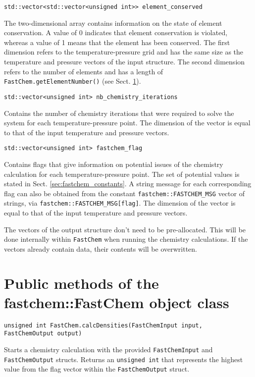 \documentclass[numbers=noenddot]{aux/fcmanual}
\newcommand{\fc}{\texttt{FastChem}\xspace}
\begin{document}
\lstinline!std::vector<std::vector<unsigned int>> element_conserved!
\begin{addmargin}[25pt]{0pt}
  The two-dimensional array contains information on the state of element conservation. A value of 0 indicates that element conservation is violated, whereas a value of 1 means that the element has been conserved. The first dimension refers to the temperature-pressure grid and has the same size as the temperature and pressure vectors of the input structure. The second dimension refers to the number of elements and has a length of \lstinline!FastChem.getElementNumber()! (see Sect. \ref{sec:fastchem_methods}).
\end{addmargin}

\bigbreak

\lstinline!std::vector<unsigned int> nb_chemistry_iterations!
\begin{addmargin}[25pt]{0pt}
  Contains the number of chemistry iterations that were required to solve the system for each temperature-pressure point. The dimension of the vector is equal to that of the input temperature and pressure vectors.
\end{addmargin}

\bigbreak

\lstinline!std::vector<unsigned int> fastchem_flag!
\begin{addmargin}[25pt]{0pt}
  Contains flags that give information on potential issues of the chemistry calculation for each temperature-pressure point. The set of potential values is stated in Sect. \ref{sec:fastchem_constants}. A string message for each corresponding flag can also be obtained from the constant \lstinline!fastchem::FASTCHEM_MSG! vector of strings, via \lstinline!fastchem::FASTCHEM_MSG[flag]!. The dimension of the vector is equal to that of the input temperature and pressure vectors.
\end{addmargin}

\bigbreak

The vectors of the output structure don't need to be pre-allocated. This will be done internally within \fc when running the chemistry calculations. If the vectors already contain data, their contents will be overwritten.


\section{Public methods of the fastchem::FastChem object class}
\label{sec:fastchem_methods}

\lstinline!unsigned int FastChem.calcDensities(FastChemInput input, FastChemOutput output)!
\begin{addmargin}[25pt]{0pt}
  Starts a chemistry calculation with the provided \lstinline!FastChemInput! and \lstinline!FastChemOutput! structs. Returns an \lstinline!unsigned int! that represents the highest value from the flag vector within the \lstinline!FastChemOutput! struct.
\end{addmargin}
\end{document}

